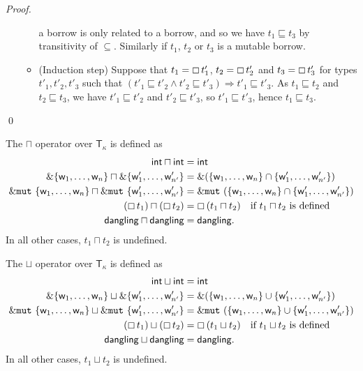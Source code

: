 \begin{proof}
\begin{itemize}
\begin{itemize}
      a borrow is only related to a borrow, and so we have
      $t_1\sqsubseteq t_3$ by transitivity of $\subseteq$.
      Similarly if $t_1$, $t_2$ or $t_3$ is a mutable borrow.
      \item (Induction step) Suppose that $t_1=\boxempty\,{t'_1}$,
      $t_2=\boxempty\,{t'_2}$ and $t_3=\boxempty\,{t'_3}$ for types
      $t'_1,t'_2,t'_3$ such that
      $(t'_1 \sqsubseteq t'_2 \land t'_2 \sqsubseteq t'_3) \Rightarrow
      t'_1 \sqsubseteq t'_3$.
      As $t_1 \sqsubseteq t_2$ and $t_2 \sqsubseteq t_3$, we have
      $t'_1 \sqsubseteq t'_2$ and $t'_2 \sqsubseteq t'_3$, so
      $t'_1 \sqsubseteq t'_3$, hence $t_1 \sqsubseteq t_3$.
    \end{itemize}
  \end{itemize}
  \qed
\end{proof}

\begin{definition}
  The $\sqcap$ operator over $\mathsf{T}_\kappa$ is defined as
  \begin{align*}
    \mathsf{int}\sqcap\mathsf{int} &= \mathsf{int}\\
    \&\{\mathsf{w}_1,\ldots,\mathsf{w}_n\} \sqcap \&\{\mathsf{w}'_1,\ldots,\mathsf{w}'_{n'}\} &= \&(\{\mathsf{w}_1,\ldots,\mathsf{w}_n\}\cap\{\mathsf{w}'_1,\ldots,\mathsf{w}'_{n'}\})\\
    \&\mathtt{mut}\ \{\mathsf{w}_1,\ldots,\mathsf{w}_n\} \sqcap \&\mathtt{mut}\ \{\mathsf{w}'_1,\ldots,\mathsf{w}'_{n'}\} &= \&\mathtt{mut}\ (\{\mathsf{w}_1,\ldots,\mathsf{w}_n\}\cap\{\mathsf{w}'_1,\ldots,\mathsf{w}'_{n'}\})\\
    (\boxempty\,{t_1}) \sqcap (\boxempty\,{t_2}) &=\boxempty\,{(t_1\sqcap t_2)}\quad\text{if $t_1\sqcap t_2$ is defined}\\
    \mathsf{dangling}\sqcap\mathsf{dangling} &= \mathsf{dangling}.
  \end{align*}
  In all other cases, $t_1\sqcap t_2$ is undefined.
\end{definition}

\begin{definition}
  The $\sqcup$ operator over $\mathsf{T}_\kappa$ is defined as
  \begin{align*}
    \mathsf{int}\sqcup\mathsf{int} &= \mathsf{int}\\
    \&\{\mathsf{w}_1,\ldots,\mathsf{w}_n\} \sqcup \&\{\mathsf{w}'_1,\ldots,\mathsf{w}'_{n'}\} &= \&(\{\mathsf{w}_1,\ldots,\mathsf{w}_n\}\cup\{\mathsf{w}'_1,\ldots,\mathsf{w}'_{n'}\})\\
    \&\mathtt{mut}\ \{\mathsf{w}_1,\ldots,\mathsf{w}_n\} \sqcup \&\mathtt{mut}\ \{\mathsf{w}'_1,\ldots,\mathsf{w}'_{n'}\} &= \&\mathtt{mut}\ (\{\mathsf{w}_1,\ldots,\mathsf{w}_n\}\cup\{\mathsf{w}'_1,\ldots,\mathsf{w}'_{n'}\})\\
    (\boxempty\,{t_1}) \sqcup (\boxempty\,{t_2}) &=\boxempty\,{(t_1\sqcup t_2)}\quad\text{if $t_1\sqcup t_2$ is defined}\\
    \mathsf{dangling}\sqcup\mathsf{dangling} &= \mathsf{dangling}.
  \end{align*}
  In all other cases, $t_1\sqcup t_2$ is undefined.
\end{definition}

